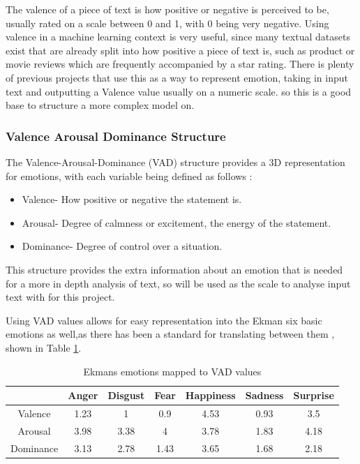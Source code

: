 The valence of a piece of text is how positive or negative is perceived to be, usually rated on a scale between 0 and 1, with 0 being very negative.
Using valence in a machine learning context is very useful, since many textual datasets exist that are already split into how positive a piece of text is, such as product or movie reviews which are frequently accompanied by a star rating. There is plenty of previous projects that use this as a way to represent emotion, taking in input text and outputting a Valence value usually on a numeric scale. so this is a good base to structure a more complex model on.

\subsubsection{Valence Arousal Dominance Structure}

The Valence-Arousal-Dominance (VAD) structure provides a 3D representation for emotions, with each variable being defined as follows \cite{VAD}:
\begin{itemize}
    \item Valence- How positive or negative the statement is.
    \item Arousal- Degree of calmness or excitement, the energy of the statement. 
    \item Dominance- Degree of control over a situation.
\end{itemize}

This structure provides the extra information about an emotion that is needed for a more in depth analysis of text, so will be used as the scale to analyse input text with for this project.

Using VAD values allows for easy representation into the Ekman six basic emotions as well,as there has been a standard for translating between them \cite{VADMapping}, shown in Table \ref{ekmansTable}.


\begin{table}[ht]
\caption{Ekmans emotions mapped to VAD values \cite{VADMapping}}
\centering
\begin{tabular}{ |c|c|c|c|c|c|c| } 
 \hline
  & Anger & Disgust & Fear & Happiness & Sadness & Surprise \\ 
 \hline                        
 Valence & 1.23 & 1 & 0.9 & 4.53 & 0.93 & 3.5\\ 
 Arousal & 3.98 & 3.38 & 4 & 3.78 & 1.83 & 4.18\\ 
 Dominance & 3.13 & 2.78 & 1.43 & 3.65 & 1.68 & 2.18\\ 
 \hline
\end{tabular}
\label{ekmansTable}
\end{table}


